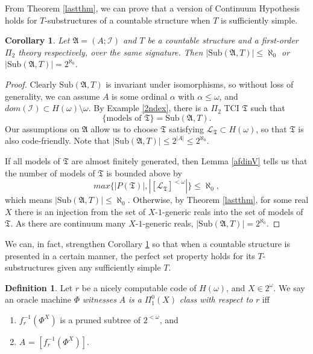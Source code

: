 \documentclass[12pt, twoside]{memoir}
\numberwithin{equation}{section}
\newtheorem{cor}[thm]{Corollary}
\theoremstyle{definition}
\newtheorem{defi}[thm]{Definition}
\theoremstyle{remark}
\theoremstyle{definition}
\theoremstyle{definition}
\theoremstyle{definition}
\theoremstyle{remark}
\begin{document}
From Theorem \ref{lastthm}, we can prove that a version of Continuum Hypothesis holds for $T$-substructures of a countable structure when $T$ is sufficiently simple.

\begin{cor}\label{lastcor}
Let $\mathfrak{A} = (A; \mathcal{I})$ and $T$ be a countable structure and a first-order $\Pi_2$ theory respectively, over the same signature. Then $|\mathrm{Sub}(\mathfrak{A}, T)| \leq \aleph_0$ or $|\mathrm{Sub}(\mathfrak{A}, T)| = 2^{\aleph_0}$.
\end{cor}

\begin{proof}
Clearly $\mathrm{Sub}(\mathfrak{A}, T)$ is invariant under isomorphisms, so without loss of generality, we can assume $A$ is some ordinal $\alpha$ with $\alpha \leq \omega$, and $dom(\mathcal{I}) \subset H(\omega) \setminus \omega$. By Example \ref{2ndex}, there is a $\Pi_2$ TCI $\mathfrak{T}$ such that $$\{ \text{models of } \mathfrak{T}\} = \mathrm{Sub}(\mathfrak{A}, T).$$ Our assumptions on $\mathfrak{A}$ allow us to choose $\mathfrak{T}$ satisfying $\mathcal{L}_{\mathfrak{T}} \subset H(\omega)$, so that $\mathfrak{T}$ is also code-friendly. Note that $|\mathrm{Sub}(\mathfrak{A}, T)| \leq 2^{|A|} \leq 2^{\aleph_0}$.

If all models of $\mathfrak{T}$ are almost finitely generated, then Lemma \ref{afdinV} tells us that the number of models of $\mathfrak{T}$ is bounded above by $$max\{|P(\mathfrak{T})|, |[\mathcal{L}_{\mathfrak{T}}]^{< \omega}|\} \leq \aleph_0,$$ which means $|\mathrm{Sub}(\mathfrak{A}, T)| \leq \aleph_0$. Otherwise, by Theorem \ref{lastthm}, for some real $X$ there is an injection from the set of $X$-$1$-generic reals into the set of models of $\mathfrak{T}$. As there are continuum many $X$-$1$-generic reals, $|\mathrm{Sub}(\mathfrak{A}, T)| = 2^{\aleph_0}$.
\end{proof}

We can, in fact, strengthen Corollary \ref{lastcor} so that when a countable structure is presented in a certain manner, the perfect set property holds for its $T$-substructures given any sufficiently simple $T$. 

\begin{defi}
Let $r$ be a nicely computable code of $H(\omega)$, and $X \in 2^{\omega}$. We say an oracle machine $\Phi$ \emph{witnesses} $A$ \emph{is a} $\Pi^0_1(X)$ \emph{class with respect to} $r$ iff 
\begin{enumerate}[label=(\arabic*)] 
    \item $f_r^{-1}(\Phi^X)$ is a pruned subtree of $2^{<\omega}$, and
    \item $A$ = $[f_r^{-1}(\Phi^X)]$.
\end{enumerate} 
\end{defi}
\end{document}
